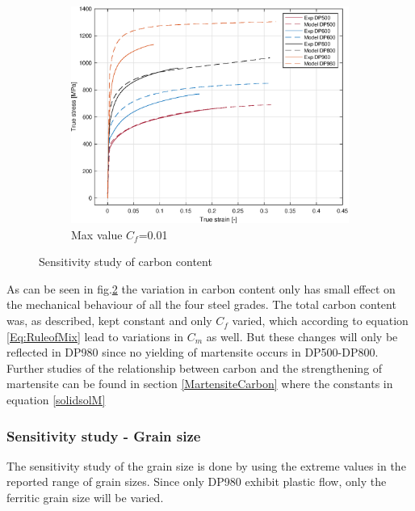 \documentclass{article}
\begin{document}
\begin{figure}[h!]
          \hfill
     \begin{subfigure}[b]{0.3\textwidth}
         \centering
         \includegraphics[width=\textwidth]{CarbonMax.eps}
         \caption{Max value $C_f$=0.01}
         \label{fig:CarbonMax}
     \end{subfigure}
     \caption{Sensitivity study of carbon content}
     \label{fig:CarbonContent}
\end{figure}

As can be seen in fig.\ref{fig:CarbonContent} the variation in carbon content only has small effect on the mechanical behaviour of all the four steel grades. The total carbon content was, as described, kept constant and only $C_f$ varied, which according to equation \ref{Eq:RuleofMix} lead to variations in $C_m$ as well. But these changes will only be reflected in DP980 since no yielding of martensite occurs in DP500-DP800. 
Further studies of the relationship between carbon and the strengthening of martensite can be found in section \ref{MartensiteCarbon} where the constants in equation \ref{solidsolM}


\subsubsection{Sensitivity study - Grain size}
\label{SensStudyGrain}
The sensitivity study of the grain size is done by using the extreme values in the reported range of grain sizes. Since only DP980 exhibit plastic flow, only the ferritic grain size will be varied. 
\end{document}
